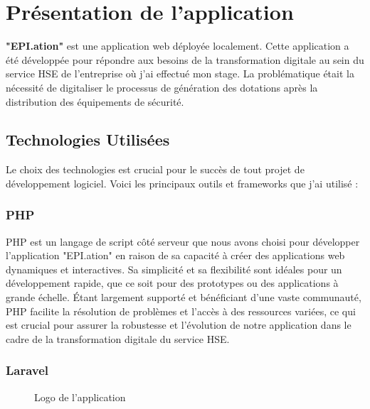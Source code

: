 \documentclass[a4paper,12pt]{report}
\begin{document}
\section{Présentation de l'application}

\textbf{"EPI.ation"} est une application web déployée localement. Cette application a été développée pour répondre aux besoins de la transformation digitale au sein du service HSE de l'entreprise où j'ai effectué mon stage. La problématique était la nécessité de digitaliser le processus de génération des dotations après la distribution des équipements de sécurité.

\subsection{Technologies Utilisées}

Le choix des technologies est crucial pour le succès de tout projet de développement logiciel. Voici les principaux outils et frameworks que j'ai utilisé :

\subsubsection{PHP}

PHP est un langage de script côté serveur que nous avons choisi pour développer l'application "EPI.ation" en raison de sa capacité à créer des applications web dynamiques et interactives. Sa simplicité et sa flexibilité sont idéales pour un développement rapide, que ce soit pour des prototypes ou des applications à grande échelle. Étant largement supporté et bénéficiant d'une vaste communauté, PHP facilite la résolution de problèmes et l'accès à des ressources variées, ce qui est crucial pour assurer la robustesse et l'évolution de notre application dans le cadre de la transformation digitale du service HSE.

\subsubsection{Laravel}
\begin{figure}[H]
    \centering
    \caption{Logo de l'application}
\end{figure}
\end{document}
